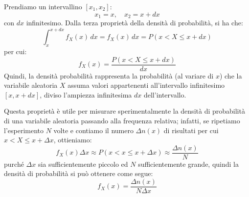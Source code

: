 \documentclass[a4paper,11pt]{article}
\begin{document}
\noindent
Prendiamo un intervallino $[x_1, x_2]$: 
$$
x_1 = x, \quad x_2 = x + dx
$$
con $dx$ infinitesimo. Dalla terza proprietà della densità di probabilità, si ha che:
$$
\int_{x}^{x + dx} f_X(x) \, dx = f_X(x) \, dx = P(x < X \leq x + dx)
$$
per cui:
$$
f_X(x) = \frac{P(x < X \leq x + dx)}{dx}
$$
Quindi, la densità probabilità rappresenta la probabilità (al variare di $x$) che la variabile aleatoria $X$ assuma valori appartenenti all’intervallo infinitesimo $[x, x+dx]$, diviso l’ampiezza infinitesima $dx$ dell’intervallo.

Questa proprietà è utile per misurare sperimentalmente la densità di probabilità di una variabile aleatoria passando alla frequenza relativa; infatti, se ripetiamo l’esperimento $N$ volte e contiamo il numero $\Delta n(x)$ di risultati per cui $x < X \leq x + \Delta x$, ottieniamo:
$$
f_X(x) \Delta x \approx P(x < x \leq x + \Delta x) \approx \frac{\Delta n(x)}{N}
$$
purché $\Delta x$ sia sufficientemente piccolo ed $N$ sufficientemente grande, quindi la densità di probabilità si può ottenere come segue:
$$
f_X(x) = \frac{\Delta n(x)}{N\Delta x}
$$
\end{document}
